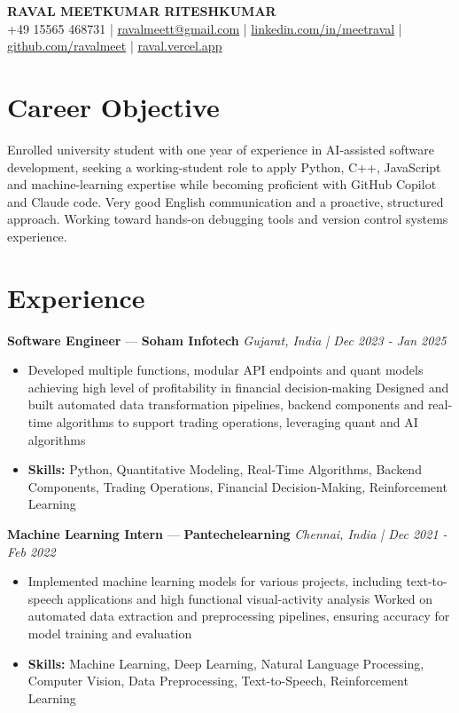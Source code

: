 \documentclass[a4paper,10pt]{article}
\begin{document}
\begin{center}
  {\Large\bfseries RAVAL MEETKUMAR RITESHKUMAR}\\[2pt]
  {\small +49 15565 468731 \;|\; \href{mailto:ravalmeett@gmail.com}{ravalmeett@gmail.com} \;|\; \href{https://www.linkedin.com/in/meetraval/}{linkedin.com/in/meetraval} \;|\; \href{https://github.com/ravalmeet}{github.com/ravalmeet} \;|\; \href{https://raval.vercel.app/}{raval.vercel.app}}
\end{center}
\vspace{-3pt}

\section*{Career Objective}
Enrolled university student with one year of experience in AI-assisted software development, seeking a working-student role to apply Python, C++, JavaScript and machine-learning expertise while becoming proficient with GitHub Copilot and Claude code. Very good English communication and a proactive, structured approach. Working toward hands-on debugging tools and version control systems experience.\par

\section*{Experience}
\textbf{Software Engineer} — \textbf{Soham Infotech} \hfill \textit{Gujarat, India \;|\; Dec 2023 - Jan 2025}\par
\vspace{1pt}
\begin{itemize}
  \item Developed multiple functions, modular API endpoints and quant models achieving high level of profitability in financial decision-making Designed and built automated data transformation pipelines, backend components and real-time algorithms to support trading operations, leveraging quant and AI algorithms
  \item \textbf{Skills:} Python, Quantitative Modeling, Real-Time Algorithms, Backend Components, Trading Operations, Financial Decision-Making, Reinforcement Learning
\end{itemize}
\vspace{3pt}
\textbf{Machine Learning Intern} — \textbf{Pantechelearning} \hfill \textit{Chennai, India \;|\; Dec 2021 - Feb 2022}\par
\vspace{1pt}
\begin{itemize}
  \item Implemented machine learning models for various projects, including text-to-speech applications and high functional visual-activity analysis Worked on automated data extraction and preprocessing pipelines, ensuring accuracy for model training and evaluation
  \item \textbf{Skills:} Machine Learning, Deep Learning, Natural Language Processing, Computer Vision, Data Preprocessing, Text-to-Speech, Reinforcement Learning
\end{itemize}
\end{document}
